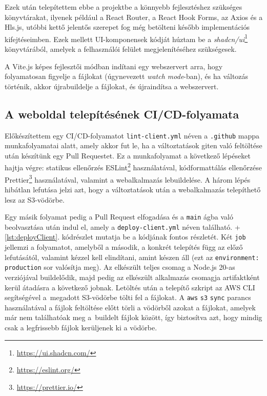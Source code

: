 Ezek után telepítettem ebbe a projektbe a könnyebb fejlesztéshez szükséges könyvtárakat, ilyenek például a React Router, a React Hook Forms, az Axios és a Hls.js, utóbbi kettő jelentős szerepet fog még betölteni később implementációs kifejtéseimben. Ezek mellett UI-komponensek kódját húztam be a \emph{shadcn/ui}\footnote{\url{https://ui.shadcn.com/}} könyvtárából, amelyek a felhasználói felület megjelenítéséhez szükségesek.

A Vite.js képes fejlesztői módban indítani egy webszervert arra, hogy folyamatosan figyelje a fájlokat (úgynevezett \emph{watch mode}-ban), és ha változás történik, akkor újrabuildelje a fájlokat, és újraindítsa a webszervert.

\subsection{A weboldal telepítésének CI/CD-folyamata}\label{sec:ciCd}

Előkészítettem egy CI/CD-folyamatot \verb|lint-client.yml| néven a \verb|.github| mappa munkafolyamatai alatt, amely akkor fut le, ha a változtatások giten való feltöltése után készítünk egy Pull Requestet. Ez a munkafolyamat a következő lépéseket hajtja végre: statikus ellenőrzés ESLint\footnote{\url{https://eslint.org/}} használatával, kódformattálás ellenőrzése Prettier\footnote{\url{https://prettier.io/}} használatával, valamint a webalkalmazás lebuildelése. A három lépés hibátlan lefutása jelzi azt, hogy a változtatások után a webalkalmazás telepíthető lesz az S3-vödörbe.

Egy másik folyamat pedig a Pull Request elfogadása és a \verb|main| ágba való beolvasztása után indul el, amely a \verb|deploy-client.yml| néven található. \Az+\ref{lst:deployClient}. kódrészlet mutatja be a kódjának fontos részletét. Két \verb|job| jellemzi a folyamatot, amelyből a második, a konkrét telepítés függ az előző lefutásától, valamint kézzel kell elindítani, amint készen áll (ezt az \verb|environment: production| sor valósítja meg). Az elkészült teljes csomag a Node.js 20-as verziójával buildelődik, majd pedig az elkészült alkalmazás csomagja artifaktként kerül átadásra a következő jobnak. Letöltés után a telepítő szkript az AWS CLI segítségével a~megadott S3-vödörbe tölti fel a fájlokat. A \verb|aws| \verb|s3| \verb|sync| parancs használatával a fájlok feltöltése előtt törli a vödörből azokat a fájlokat, amelyek már nem találhatóak meg a~buildelt fájlok között, így biztosítva azt, hogy mindig csak a legfrissebb fájlok kerüljenek ki a vödörbe.

